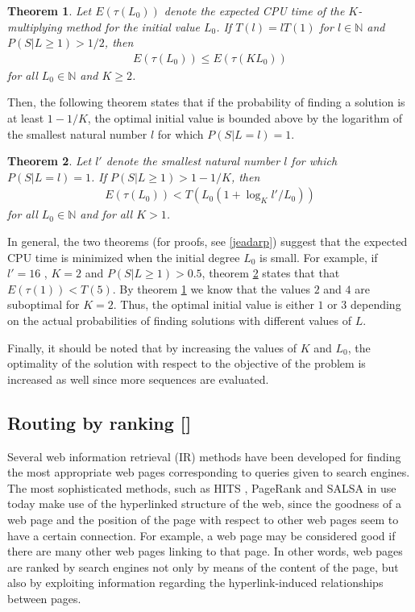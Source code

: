 \documentclass[dissertation,draft*]{aaltoseries}
\newtheorem{theorem}{Theorem}
\begin{document}
\begin{theorem}
\label{doublingthm01}
Let $E(\tau(L_0))$ denote the expected CPU time of the $K$-multiplying method for the initial value $L_0$. If
$T(l) = l T(1)$ for $l \in \mathbb{N}$ and $P(S|L \geq 1) > 1/2$, then
\begin{align*}
E(\tau(L_0)) \leq E(\tau(KL_0))
\end{align*}
for all $L_0 \in \mathbb{N}$ and $K \geq 2$.
\end{theorem}
Then, the following theorem states that if the probability of finding a solution
is at least $1 - 1/K$, the optimal initial value is 
bounded above by the logarithm of the smallest natural number $l$ for which $P(S|L=l)=1$.

\begin{theorem}
\label{doublingthm02}
Let $l'$ denote the smallest natural number $l$ for which $P(S|L=l)=1$.
If $P(S|L \geq 1) > 1 - 1/K$, then 
\begin{align*}
E(\tau(L_0)) < T(L_0(1+\log_K l'/L_0))
\end{align*}
for all $L_0 \in \mathbb{N}$ and for all $K > 1$.
\end{theorem}

In general, the two theorems (for proofs, see \ref{jeadarp}) suggest that the expected 
CPU time is minimized when the initial degree $L_0$ is small. 
For example, if $l' = 16$ , $K=2$ and $P(S|L \geq 1) > 0.5$, theorem \ref{doublingthm02} states that
that $E(\tau(1)) < T(5)$. By theorem \ref{doublingthm01} we know that
the values $2$ and $4$ are suboptimal for $K=2$. Thus, the optimal initial value
is either $1$ or $3$ depending on the actual probabilities of finding solutions with different values of $L$. 

Finally, it should be noted that 
by increasing the values of $K$ and $L_0$, the optimality of the 
solution with respect to the objective of the problem is increased as well since more sequences are evaluated.

\subsection{Routing by ranking []}
\label{routingbyranking}
Several web information retrieval (IR) methods have been developed
for finding the most appropriate web pages corresponding to 
queries given to search engines. The most sophisticated methods, such as HITS \cite{kleinberg}, PageRank \cite{brin01} and SALSA \cite{lempel}
in use today make use of the hyperlinked structure of the web, since
the goodness of a web page and the position of the page with respect to
other web pages seem to have a certain connection. 
For example, a web page may be
considered good if there are many other web pages linking to that page. In other words, 
web pages are ranked by search engines not only by means of the content of the page, but
also by exploiting information regarding the hyperlink-induced relationships between pages.
\end{document}
